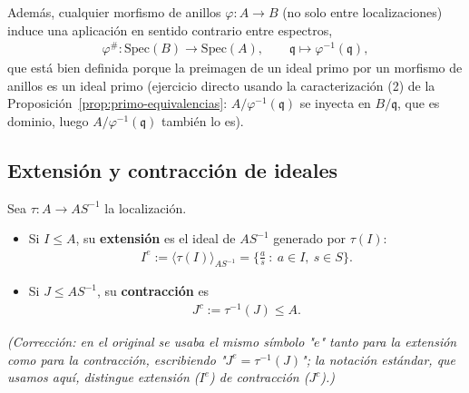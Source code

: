 Además, cualquier morfismo de anillos $\varphi: A\to B$ (no solo entre localizaciones) induce una aplicación en sentido contrario entre espectros,
\begin{gather*}
    \varphi^{\#}: \mathrm{Spec}(B) \to \mathrm{Spec}(A), \qquad \mathfrak q \mapsto \varphi^{-1}(\mathfrak q),
\end{gather*}
que está bien definida porque la preimagen de un ideal primo por un morfismo de anillos es un ideal primo (ejercicio directo usando la caracterización (2) de la Proposición~\ref{prop:primo-equivalencias}: $A/\varphi^{-1}(\mathfrak q)$ se inyecta en $B/\mathfrak q$, que es dominio, luego $A/\varphi^{-1}(\mathfrak q)$ también lo es).

\subsection{Extensión y contracción de ideales}

Sea $\tau: A\to AS^{-1}$ la localización.
\begin{itemize}
    \item Si $I\leq A$, su \textbf{extensión} es el ideal de $AS^{-1}$ generado por $\tau(I)$:
    \begin{gather*}
        I^e := \langle \tau(I)\rangle_{AS^{-1}} = \Big\{\frac{a}{s} \ :\ a\in I,\ s\in S\Big\}.
    \end{gather*}
    \item Si $J\leq AS^{-1}$, su \textbf{contracción} es
    \begin{gather*}
        J^c := \tau^{-1}(J) \leq A.
    \end{gather*}
\end{itemize}

\emph{(Corrección: en el original se usaba el mismo símbolo "$e$" tanto para la extensión como para la contracción, escribiendo "$J^e=\tau^{-1}(J)$"; la notación estándar, que usamos aquí, distingue extensión ($I^e$) de contracción ($J^c$).)}

